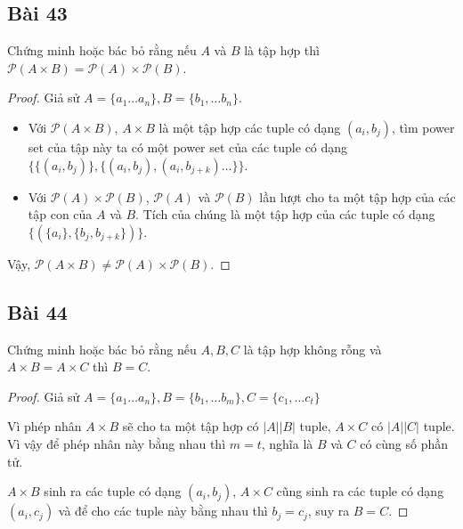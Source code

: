 \subsection*{Bài 43}
Chứng minh hoặc bác bỏ rằng nếu $A$ và $B$ là tập hợp thì $\mathcal{P}(A\times B)=\mathcal{P}(A)\times\mathcal{P}(B)$.
\begin{proof}
    Giả sử $A=\{a_1\dots a_n\},B=\{b_1,\dots b_n\}$.
    \begin{itemize}
        \item Với $\mathcal{P}(A\times B)$, $A\times B$ là một tập hợp các tuple có dạng $(a_i,b_j)$, tìm power set của tập này ta có một power set của các tuple có dạng $\{\{(a_i,b_j)\},\{(a_i,b_j),(a_i,b_{j+k})\dots\}\}$.
        \item Với $\mathcal{P}(A)\times\mathcal{P}(B)$, $\mathcal{P}(A)$ và $\mathcal{P}(B)$ lần lượt cho ta một tập hợp của các tập con của $A$ và $B$. Tích của chúng là một tập hợp của các tuple có dạng $\{(\{a_i\},\{b_j,b_{j+k}\})\}$.
    \end{itemize}
    Vậy, $\mathcal{P}(A\times B)\neq\mathcal{P}(A)\times\mathcal{P}(B)$.
\end{proof}
\subsection*{Bài 44}
Chứng minh hoặc bác bỏ rằng nếu $A,B,C$ là tập hợp không rỗng và $A\times B=A\times C$ thì $B=C$.
\begin{proof}
    Giả sử $A=\{a_1\dots a_n\},B=\{b_1,\dots b_m\},C=\{c_1,\dots c_t\}$
    
    Vì phép nhân $A\times B$ sẽ cho ta một tập hợp có $|A||B|$ tuple, $A\times C$ có $|A||C|$ tuple. Vì vậy để phép nhân này bằng nhau thì $m=t$, nghĩa là $B$ và $C$ có cùng số phần tử.

    $A\times B$ sinh ra các tuple có dạng $(a_i,b_j)$, $A\times C$ cũng sinh ra các tuple có dạng $(a_i,c_j)$ và để cho các tuple này bằng nhau thì $b_j=c_j$, suy ra $B=C$.
\end{proof}

